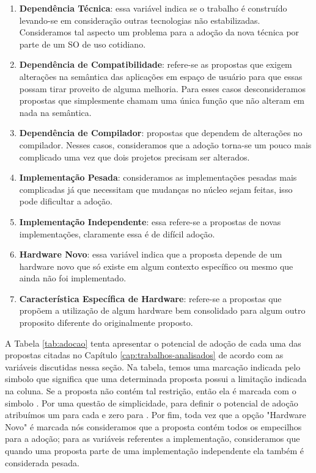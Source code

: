 \begin{enumerate}
  \item
\textbf{Dependência Técnica}: essa variável indica se o trabalho é construído
levando-se em consideração outras tecnologias não estabilizadas. Consideramos
tal aspecto um problema para a adoção da nova técnica por parte de um SO de uso
cotidiano.

  \item
\textbf{Dependência de Compatibilidade}: refere-se as propostas que exigem
alterações na semântica das aplicações em espaço de usuário para que essas
possam tirar proveito de alguma melhoria. Para esses casos desconsideramos
propostas que simplesmente chamam uma única função que não alteram em nada na
semântica.

  \item
\textbf{Dependência de Compilador}: propostas que dependem de alterações no
compilador. Nesses casos, consideramos que a adoção torna-se um pouco mais
complicado uma vez que dois projetos precisam ser alterados.

  \item
\textbf{Implementação Pesada}: consideramos as implementações pesadas mais
complicadas já que necessitam que mudanças no núcleo sejam feitas, isso pode
dificultar a adoção.

  \item
\textbf{Implementação Independente}: essa refere-se a propostas de novas
implementações, claramente essa é de difícil adoção.

  \item
\textbf{Hardware Novo}: essa variável indica que a proposta depende de um
hardware novo que só existe em algum contexto específico ou mesmo que ainda não
foi implementado.

  \item
\textbf{Característica Específica de Hardware}: refere-se a propostas que
propõem a utilização de algum hardware bem consolidado para algum outro
proposito diferente do originalmente proposto.

\end{enumerate}

A Tabela \ref{tab:adocao} tenta apresentar o potencial de adoção de cada uma
das propostas citadas no Capítulo \ref{cap:trabalhos-analisados} de acordo com
as variáveis discutidas nessa seção. Na tabela, temos uma marcação indicada
pelo simbolo  que significa que uma determinada proposta possui a
limitação indicada na coluna. Se a proposta não contém tal restrição, então ela
é marcada com o simbolo . Por uma questão de simplicidade, para
definir o potencial de adoção atribuímos um para cada  e zero para
. Por fim, toda vez que a opção "Hardware Novo" é marcada nós
consideramos que a proposta contém todos os empecilhos para a adoção; para as
variáveis referentes a implementação, consideramos que quando uma proposta
parte de uma implementação independente ela também é considerada pesada.


